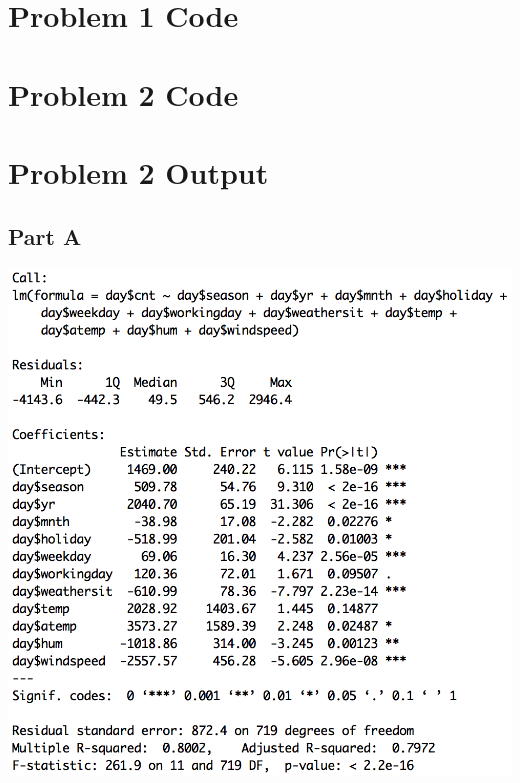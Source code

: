 \documentclass[11pt]{article}
\begin{document}
\pagebreak

\appendix
\section{Problem 1 Code}
\label{sec:problem1code}

\pagebreak

\section{Problem 2 Code}
\label{sec:problem2code}

\pagebreak

\section{Problem 2 Output}
\label{sec:problem2output}
\subsection{Part A}
\label{subsec:problem2aoutput}
\includegraphics[totalheight=0.65\textheight]{Part2Aoutput}
\end{document}
